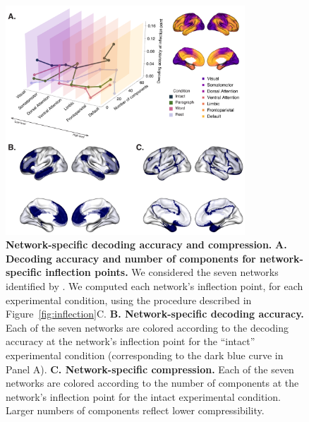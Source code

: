 \documentclass[english, 11pt]{article}
\begin{document}
\begin{figure}
  \centering
  \includegraphics[width=0.8\textwidth]{figs/decode_pcs_network}

  \caption{\textbf{Network-specific decoding accuracy and compression.}
  \textbf{A. Decoding accuracy and number of components for network-specific
  inflection points.} We considered the seven networks identified by
  \cite{YeoEtal11}. We computed each network's inflection point, for each
  experimental condition, using the procedure described in
  Figure~\ref{fig:inflection}C. \textbf{B. Network-specific decoding
  accuracy.} Each of the seven networks are colored according to the decoding
  accuracy at the network's inflection point for the ``intact'' experimental
  condition (corresponding to the dark blue curve in Panel A). \textbf{C.
  Network-specific compression.} Each of the seven networks are colored
  according to the number of components at the network's inflection point for
  the intact experimental condition. Larger numbers of components reflect lower
  compressibility.}

  \label{fig:networks}
\end{figure}
\end{document}
